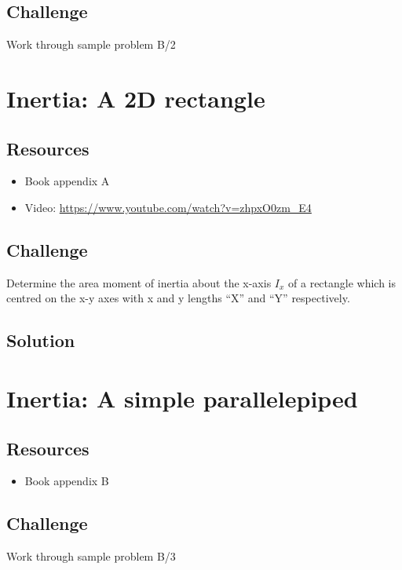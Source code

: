 \subsection*{Challenge}
Work through sample problem B/2




\newpage
\section{Inertia: A 2D rectangle}

\subsection*{Resources}
\begin{itemize}
    \item Book appendix A
    \item Video: \url{https://www.youtube.com/watch?v=zhpxO0zm_E4}
\end{itemize}

\subsection*{Challenge}
Determine the area moment of inertia about the x-axis $I_x$ of a rectangle which is centred on the x-y axes with x and y lengths ``X'' and ``Y'' respectively.

\subsection*{Solution}




\newpage
\section{Inertia: A simple parallelepiped}

\subsection*{Resources}
\begin{itemize}
    \item Book appendix B
\end{itemize}

\subsection*{Challenge}
Work through sample problem B/3




\fi
